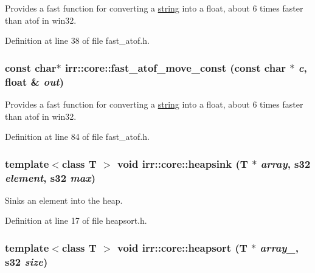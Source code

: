 Provides a fast function for converting a \hyperlink{classirr_1_1core_1_1string}{string} into a float, about 6 times faster than atof in win32. 

Definition at line 38 of file fast\_\-atof.h.\hypertarget{namespaceirr_1_1core_b092292087196d1b1e19b80b7cdaf05d}{
\subsubsection[{fast\_\-atof\_\-move\_\-const}]{\setlength{\rightskip}{0pt plus 5cm}const char$\ast$ irr::core::fast\_\-atof\_\-move\_\-const (const char $\ast$ {\em c}, \/  float \& {\em out})}}
\label{namespaceirr_1_1core_b092292087196d1b1e19b80b7cdaf05d}


Provides a fast function for converting a \hyperlink{classirr_1_1core_1_1string}{string} into a float, about 6 times faster than atof in win32. 

Definition at line 84 of file fast\_\-atof.h.\hypertarget{namespaceirr_1_1core_d22e0ca7ac302752a27dc29f35a21ec6}{
\subsubsection[{heapsink}]{\setlength{\rightskip}{0pt plus 5cm}template$<$class T $>$ void irr::core::heapsink (T $\ast$ {\em array}, \/  s32 {\em element}, \/  s32 {\em max})}}
\label{namespaceirr_1_1core_d22e0ca7ac302752a27dc29f35a21ec6}


Sinks an element into the heap. 



Definition at line 17 of file heapsort.h.\hypertarget{namespaceirr_1_1core_4f062bd63b7d3048b4af2127e4a708c5}{
\subsubsection[{heapsort}]{\setlength{\rightskip}{0pt plus 5cm}template$<$class T $>$ void irr::core::heapsort (T $\ast$ {\em array\_\-}, \/  s32 {\em size})}}
\label{namespaceirr_1_1core_4f062bd63b7d3048b4af2127e4a708c5}


